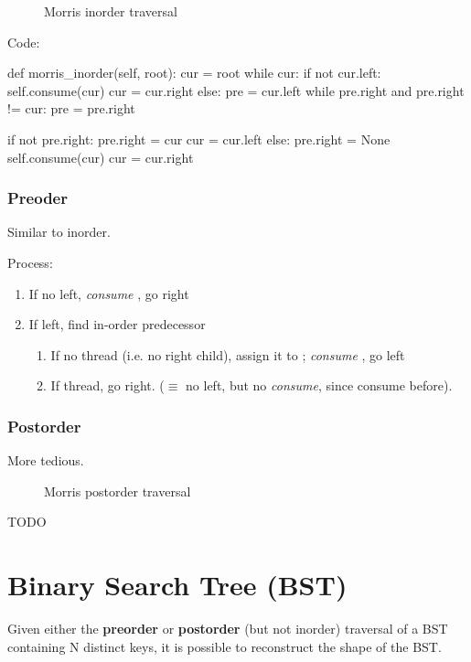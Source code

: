 \begin{figure*}[hbtp]
\centering
{}
\caption{Morris inorder traversal}
\label{fig:morrisInorder}
\end{figure*}

Code:
\begin{python}
def morris_inorder(self, root):
    cur = root
    while cur:
        if not cur.left:
            self.consume(cur)
            cur = cur.right
        else:
            pre = cur.left
            while pre.right and pre.right != cur:
                pre = pre.right

            if not pre.right:
                pre.right = cur
                cur = cur.left
            else:
                pre.right = None
                self.consume(cur)
                cur = cur.right
\end{python}
\subsubsection{Preoder}
Similar to inorder. 

Process:
\begin{enumerate}
\item If no left, \textit{consume} , go right 
\item If left, find in-order predecessor 
\begin{enumerate}
\item If no thread (i.e. no  right child), assign it to ; \textit{consume} , go left
\item If thread, go right. ($\equiv$ no left, but no \textit{consume}, since consume before). 
\end{enumerate}
\end{enumerate}

\subsubsection{Postorder}
More tedious.
\begin{figure*}[hbtp]
\centering
{}
\caption{Morris postorder traversal}
\label{fig:morrisInorder}
\end{figure*}

TODO

\section{Binary Search Tree (BST)}
Given either the \textbf{preorder} or \textbf{postorder} (but not inorder) traversal of a BST containing N distinct keys, it is possible to reconstruct the shape of the BST. 
